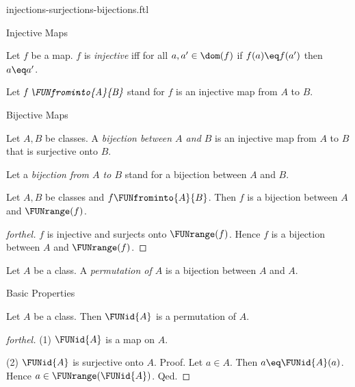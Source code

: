 \documentclass{naproche-library}
\begin{document}
\begin{smodule}[title={Injective, Surjective and Bijective Maps}]{injections-surjections-bijections.ftl}
\begin{sfragment}{Injective Maps}
  \begin{definition}[forthel,id=FOUNDATIONS_08_605931408719872]
    Let $f$ be a map.
    $f$ is \emph{injective} iff for all $a, a' \in \dom(f)$ if $f(a) \eq f(a')$ then $a \eq a'$.

    Let $\emph{f \FUNfrominto{A}{B}}$ stand for $f$ is an injective map from $A$ to $B$.
  \end{definition}
\end{sfragment}

\begin{sfragment}{Bijective Maps}
  \begin{definition}[forthel,id=FOUNDATIONS_08_3356670992318464]
    Let $A, B$ be classes.
    A \emph{bijection between $A$ and $B$} is an injective map from $A$ to $B$ that is surjective onto $B$.

    Let a \emph{bijection from $A$ to $B$} stand for a bijection between $A$ and $B$.
  \end{definition}

  \begin{proposition}[forthel,id=FOUNDATIONS_08_60881194975232]
    Let $A, B$ be classes and $f \FUNfrominto{A}{B}$.
    Then $f$ is a bijection between $A$ and $\FUNrange(f)$.
  \end{proposition}
  \begin{proof}[forthel]
    $f$ is injective and surjects onto $\FUNrange(f)$.
    Hence $f$ is a bijection between $A$ and $\FUNrange(f)$.
  \end{proof}

  \begin{definition}[forthel,id=FOUNDATIONS_08_8188451318923264]
    Let $A$ be a class.
    A \emph{permutation of $A$} is a bijection between $A$ and $A$.
  \end{definition}
\end{sfragment}

\begin{sfragment}{Basic Properties}
  \begin{proposition}[forthel,id=FOUNDATIONS_08_7883784041005056]
    Let $A$ be a class.
    Then $\FUNid{A}$ is a permutation of $A$.
  \end{proposition}
  \begin{proof}[forthel]
    (1) $\FUNid{A}$ is a map on $A$.

    (2) $\FUNid{A}$ is surjective onto $A$. \newline
    Proof.
      Let $a \in A$.
      Then $a \eq \FUNid{A}(a)$.
      Hence $a \in \FUNrange(\FUNid{A})$.
    Qed.


\end{proof}
\end{sfragment}
\end{smodule}
\end{document}
